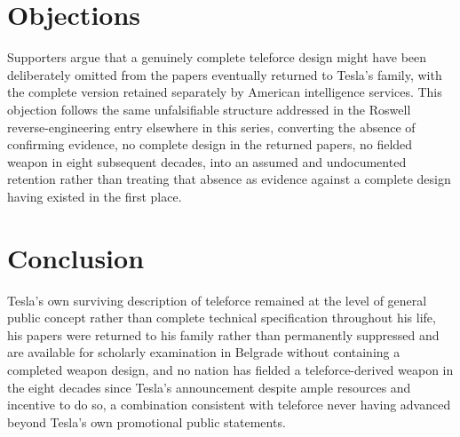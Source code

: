 \documentclass[11pt]{article}
\begin{document}
\section{Objections}

Supporters argue that a genuinely complete teleforce design might have been deliberately omitted from the papers eventually returned to Tesla's family, with the complete version retained separately by American intelligence services. This objection follows the same unfalsifiable structure addressed in the Roswell reverse-engineering entry elsewhere in this series, converting the absence of confirming evidence, no complete design in the returned papers, no fielded weapon in eight subsequent decades, into an assumed and undocumented retention rather than treating that absence as evidence against a complete design having existed in the first place.

\section{Conclusion}

Tesla's own surviving description of teleforce remained at the level of general public concept rather than complete technical specification throughout his life, his papers were returned to his family rather than permanently suppressed and are available for scholarly examination in Belgrade without containing a completed weapon design, and no nation has fielded a teleforce-derived weapon in the eight decades since Tesla's announcement despite ample resources and incentive to do so, a combination consistent with teleforce never having advanced beyond Tesla's own promotional public statements.
\end{document}
